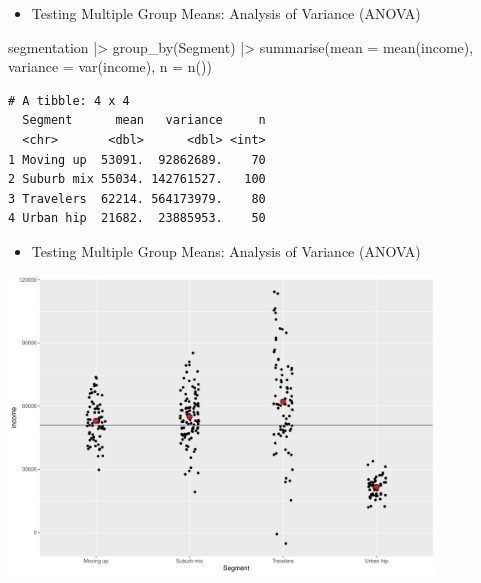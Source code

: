 \documentclass[
  ignorenonframetext,
]{beamer}
\newenvironment{Shaded}{\begin{snugshade}}{\end{snugshade}}
\newcommand{\AttributeTok}[1]{\textcolor[rgb]{0.40,0.45,0.13}{#1}}
\newcommand{\FunctionTok}[1]{\textcolor[rgb]{0.28,0.35,0.67}{#1}}
\newcommand{\NormalTok}[1]{\textcolor[rgb]{0.00,0.23,0.31}{#1}}
\newcommand{\SpecialCharTok}[1]{\textcolor[rgb]{0.37,0.37,0.37}{#1}}
\providecommand{\tightlist}{%
  \setlength{\itemsep}{0pt}\setlength{\parskip}{0pt}}\usepackage{longtable,booktabs,array}
\begin{document}
\begin{frame}[fragile]{}
\label{section-22}
\begin{itemize}
\tightlist
\item
  Testing Multiple Group Means: Analysis of Variance (ANOVA)
\end{itemize}

\tiny

\begin{Shaded}
\begin{Highlighting}[]
\NormalTok{segmentation }\SpecialCharTok{|\textgreater{}} 
  \FunctionTok{group\_by}\NormalTok{(Segment) }\SpecialCharTok{|\textgreater{}} 
  \FunctionTok{summarise}\NormalTok{(}\AttributeTok{mean =} \FunctionTok{mean}\NormalTok{(income),}
            \AttributeTok{variance =} \FunctionTok{var}\NormalTok{(income),}
            \AttributeTok{n =} \FunctionTok{n}\NormalTok{())}
\end{Highlighting}
\end{Shaded}

\begin{verbatim}
# A tibble: 4 x 4
  Segment      mean   variance     n
  <chr>       <dbl>      <dbl> <int>
1 Moving up  53091.  92862689.    70
2 Suburb mix 55034. 142761527.   100
3 Travelers  62214. 564173979.    80
4 Urban hip  21682.  23885953.    50
\end{verbatim}
\end{frame}

\begin{frame}{}
\label{section-23}
\begin{itemize}
\tightlist
\item
  Testing Multiple Group Means: Analysis of Variance (ANOVA)
\end{itemize}

\begin{center}
\includegraphics[width=0.85\textwidth,height=\textheight]{006_comparing_groups_statistical_tests_files/figure-beamer/unnamed-chunk-21-1.pdf}
\end{center}
\end{frame}
\end{document}
